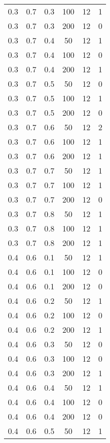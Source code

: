 \begin{center}
\begin{longtable}[c]{|c|c|c|c|c|c|}
	0.3 &  0.7 &  0.3 &  100 &    12 &     1 \\
	0.3 &  0.7 &  0.3 &  200 &    12 &     0 \\
   \hline
	0.3 &  0.7 &  0.4 &   50 &    12 &     1 \\
	0.3 &  0.7 &  0.4 &  100 &    12 &     0 \\
	0.3 &  0.7 &  0.4 &  200 &    12 &     1 \\
   \hline
	0.3 &  0.7 &  0.5 &   50 &    12 &     0 \\
	0.3 &  0.7 &  0.5 &  100 &    12 &     1 \\
	0.3 &  0.7 &  0.5 &  200 &    12 &     0 \\
   \hline
	0.3 &  0.7 &  0.6 &   50 &    12 &     2 \\
	0.3 &  0.7 &  0.6 &  100 &    12 &     1 \\
	0.3 &  0.7 &  0.6 &  200 &    12 &     1 \\
   \hline
	0.3 &  0.7 &  0.7 &   50 &    12 &     1 \\
	0.3 &  0.7 &  0.7 &  100 &    12 &     1 \\
	0.3 &  0.7 &  0.7 &  200 &    12 &     0 \\
   \hline
	0.3 &  0.7 &  0.8 &   50 &    12 &     1 \\
	0.3 &  0.7 &  0.8 &  100 &    12 &     1 \\
	0.3 &  0.7 &  0.8 &  200 &    12 &     1 \\
   \hline
	0.4 &  0.6 &  0.1 &   50 &    12 &     1 \\
	0.4 &  0.6 &  0.1 &  100 &    12 &     0 \\
	0.4 &  0.6 &  0.1 &  200 &    12 &     0 \\
   \hline
	0.4 &  0.6 &  0.2 &   50 &    12 &     1 \\
	0.4 &  0.6 &  0.2 &  100 &    12 &     0 \\
	0.4 &  0.6 &  0.2 &  200 &    12 &     1 \\
   \hline
	0.4 &  0.6 &  0.3 &   50 &    12 &     0 \\
	0.4 &  0.6 &  0.3 &  100 &    12 &     0 \\
	0.4 &  0.6 &  0.3 &  200 &    12 &     1 \\
   \hline
	0.4 &  0.6 &  0.4 &   50 &    12 &     1 \\
	0.4 &  0.6 &  0.4 &  100 &    12 &     0 \\
	0.4 &  0.6 &  0.4 &  200 &    12 &     0 \\
   \hline
	0.4 &  0.6 &  0.5 &   50 &    12 &     1 \\

\end{longtable}
\end{center}
